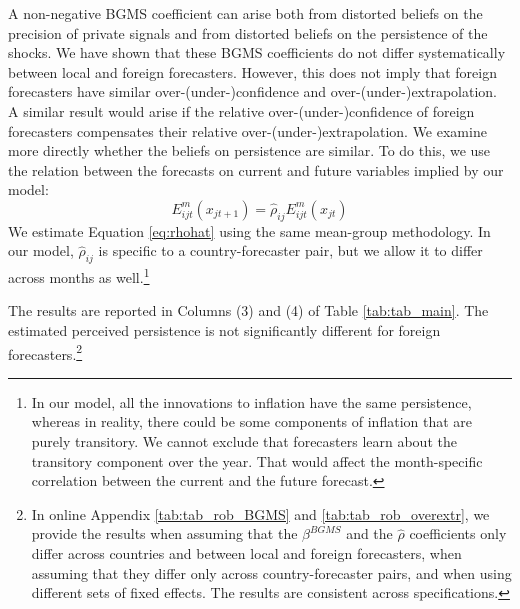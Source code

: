 A non-negative BGMS coefficient can arise both from distorted beliefs on the precision of private signals and from distorted beliefs on the persistence of the shocks. We have shown that these BGMS coefficients do not differ systematically between local and foreign forecasters. However, this does not imply that foreign forecasters have similar over-(under-)confidence and over-(under-)extrapolation. A similar result would arise if the relative over-(under-)confidence of foreign forecasters compensates their relative over-(under-)extrapolation.  We examine more directly whether the beliefs on persistence are similar. To do this, we use the relation between the forecasts on current and future variables implied by our model:
\begin{equation}E_{ijt}^m(x_{jt+1})=\hat\rho_{ij}E_{ijt}^m(x_{jt})\label{eq:rhohat}
\end{equation}
We estimate Equation \eqref{eq:rhohat} using the same mean-group methodology. In our model, $\hat\rho_{ij}$ is specific to a country-forecaster pair, but we allow it to differ across months as well.\footnote{In our model, all the innovations to inflation have the same persistence, whereas in reality, there could be some components of inflation that are purely transitory. We cannot exclude that forecasters learn about the transitory component over the year. That would affect the month-specific correlation between the current and the future forecast.}

The results are reported in Columns (3) and (4) of Table \ref{tab:tab_main}. The estimated perceived persistence is not significantly different for foreign forecasters.\footnote{In online Appendix \ref{tab:tab_rob_BGMS} and \ref{tab:tab_rob_overextr}, we provide the results when assuming that the $\beta^{BGMS}$ and the $\hat\rho$ coefficients only differ across countries and between local and foreign forecasters, when assuming that they differ only across country-forecaster pairs, and when using different sets of fixed effects. The results are consistent across specifications.}

